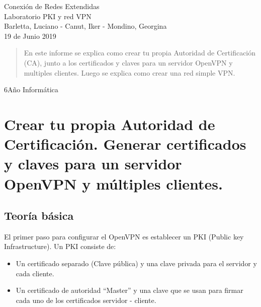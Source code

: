 \documentclass[a4paper, 12pt, usenames]{article}
\begin{document}
\begin{titlepage}
\begin{minipage}{2.6cm}
\end{minipage}
\bigskip
\bigskip
\begin{center}
\normalsize{Conexión de Redes Extendidas}\\
\bigskip
\bigskip
\bigskip
\large{Laboratorio PKI y red VPN}\\
\bigskip
\bigskip
\bigskip
\normalsize
Barletta, Luciano - Canut, Iker - Mondino, Georgina\\

\vspace*{0.5cm}
\small{19 de Junio 2019}

\vspace*{11cm}

\begin{abstract}

En este informe se explica como crear tu propia Autoridad de Certificación (CA), junto a los certificados y claves para un servidor OpenVPN y multiples clientes. Luego se explica como crear una red simple VPN.

\end{abstract}

\normalsize
6\textordmasculine Año Informática\\

\end{center}
\end{titlepage}

\renewcommand{\footrulewidth}{0.6pt}

\newpage

\section{Crear tu propia Autoridad de Certificación. Generar certificados y claves para un servidor OpenVPN y múltiples clientes.}
\subsection{Teoría básica}
El primer paso para configurar el OpenVPN es establecer un PKI (Public key Infrastructure). Un PKI consiste de:
\begin{itemize}
\item Un certificado separado (Clave pública) y una clave privada para el servidor y cada cliente.
\item Un certificado de autoridad “Master” y una clave que se usan para firmar cada uno de los certificados servidor - cliente.
\end{itemize}
\end{document}
